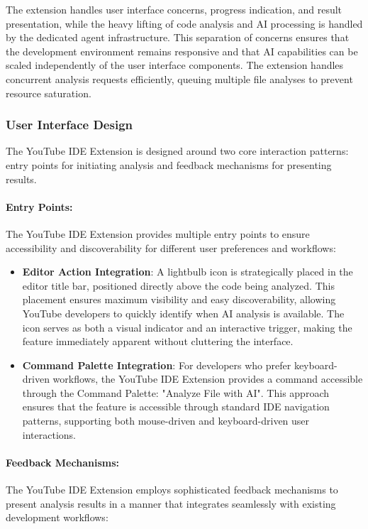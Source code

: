 \begin{spacing}{1.2}
The extension handles user interface concerns, progress indication, and result presentation, while the heavy lifting of code analysis and AI processing is handled by the dedicated agent infrastructure. This separation of concerns ensures that the development environment remains responsive and that AI capabilities can be scaled independently of the user interface components. The extension handles concurrent analysis requests efficiently, queuing multiple file analyses to prevent resource saturation.

\subsubsection{User Interface Design}
The YouTube IDE Extension is designed around two core interaction patterns: entry points for initiating analysis and feedback mechanisms for presenting results.

\paragraph{Entry Points:}
The YouTube IDE Extension provides multiple entry points to ensure accessibility and discoverability for different user preferences and workflows:

\begin{itemize}
    \item \textbf{Editor Action Integration}: A lightbulb icon is strategically placed in the editor title bar, positioned directly above the code being analyzed. This placement ensures maximum visibility and easy discoverability, allowing YouTube developers to quickly identify when AI analysis is available. The icon serves as both a visual indicator and an interactive trigger, making the feature immediately apparent without cluttering the interface.
    
    \item \textbf{Command Palette Integration}: For developers who prefer keyboard-driven workflows, the YouTube IDE Extension provides a command accessible through the Command Palette: "Analyze File with AI". This approach ensures that the feature is accessible through standard IDE navigation patterns, supporting both mouse-driven and keyboard-driven user interactions.
\end{itemize}

\paragraph{Feedback Mechanisms:}
The YouTube IDE Extension employs sophisticated feedback mechanisms to present analysis results in a manner that integrates seamlessly with existing development workflows:


\end{spacing}
